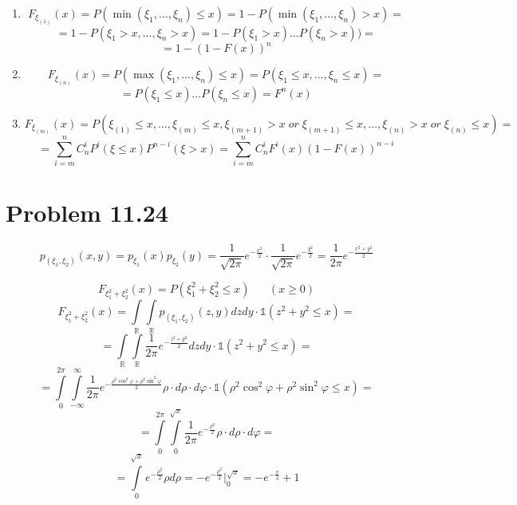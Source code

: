 \documentclass[12pt,letterpaper]{article}
\begin{document}
\begin{enumerate}
    \item 
        \[ F_{\xi_{(1)}} (x) = P(\min(\xi_1, ..., \xi_n) \leq x) = 1 - P(\min(\xi_1, ...,\xi_n) > x) = \]
        \[ = 1 - P(\xi_1 > x, ..., \xi_n > x) = 1 - P(\xi_1 > x) \dots P(\xi_n > x)) = \]
        \[ = 1 - (1 - F(x))^n \]

    \item 
        \[ F_{\xi_{(n)}}(x) = P(\max(\xi_1, ..., \xi_n) \leq x) = P(\xi_1 \leq x, \dots, \xi_n \leq x) = \]
        \[ = P(\xi_1 \leq x) \dots P(\xi_n \leq x) = F^{n}(x) \]

    \item
        \[ F_{\xi_{(m)}}(x) = P(\xi_{(1)} \leq x, \dots, \xi_{(m)} \leq x,
            \xi_{(m+1)} > x \; or \; \xi_{(m+1)} \leq x,
            \dots, \xi_{(n)} > x\; or \; \xi_{(n)} \leq x) = \]
            \[ = \sum_{i=m}^{n} C_{n}^{i} P^i(\xi \leq x) P^{n-i}(\xi > x) =
            \sum_{i=m}^{n} C_{n}^{i} F^i(x) (1-F(x))^{n-i} \]


\end{enumerate}


\section*{Problem 11.24}

\noindent{}

\[ p_{(\xi_1, \xi_2)}(x, y) = p_{\xi_1}(x) p_{\xi_2}(y) =
    \frac{1}{\sqrt{2\pi}} e ^ {- \frac{x^2}{2}} \cdot \frac{1}{\sqrt{2\pi}} e^{-\frac{y^2}{2}} =
    \frac{1}{2\pi} e^{-\frac{x^2 + y^2}{2}} \]

\[ F_{\xi_1^2 + \xi_2^2}(x) = P(\xi_1^2 + \xi_2^2 \leq x) \;\;\;\;\;\; (x \geq 0) \]
\[ F_{\xi_1^2 + \xi_2^2}(x) = \int\limits_{\mathbb{R}} \int\limits_{\mathbb{R}} 
    p_{(\xi_1, \xi_2)}(z, y) dz dy \cdot \mathds{1}(z^2 + y^2 \leq x) = 
\]
\[ = \int\limits_{\mathbb{R}} \int\limits_{\mathbb{R}}
    \frac{1}{2\pi} e^{-\frac{z^2 + y^2}{2}} dz dy \cdot \mathds{1}(z^2 + y^2 \leq x) = \]
\[ = \int\limits_{0}^{2\pi} \int\limits_{-\infty}^{\infty}
    \frac{1}{2\pi} e^{-\frac{\rho^2 \cos^2\varphi + \rho^2\sin^2\varphi}{2}}
    \rho \cdot d\rho \cdot d\varphi \cdot \mathds{1}(\rho^2 \cos^2\varphi + \rho^2\sin^2\varphi \leq x) = \]
\[ = \int\limits_{0}^{2\pi} \int\limits_{0}^{\sqrt{x}}
    \frac{1}{2\pi} e^{-\frac{\rho^2}{2}} \rho \cdot d\rho \cdot d\varphi = \]
\[ = \int\limits_{0}^{\sqrt{x}} e^{-\frac{\rho^2}{2}} \rho d\rho = 
-e^{-\frac{\rho^2}{2}} |_{0}^{\sqrt{x}} = -e^{-\frac{x}{2}} + 1 \]
\end{document}
